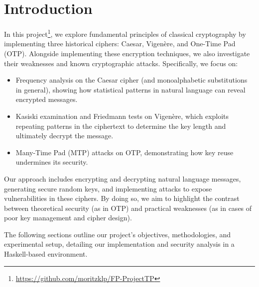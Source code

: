 \section{Introduction}
In this project\footnote{\url{https://github.com/moritzklp/FP-ProjectTP}}, 
we explore fundamental principles of classical cryptography by implementing three historical ciphers: Caesar, Vigenère, and One-Time Pad (OTP). 
Alongside implementing these encryption techniques, we also investigate their weaknesses and known cryptographic attacks. 
Specifically, we focus on:

\begin{itemize}
    \item Frequency analysis on the Caesar cipher (and monoalphabetic substitutions in general), 
    showing how statistical patterns in natural language can reveal encrypted messages.
    \item Kasiski examination and Friedmann tests on Vigenère, 
    which exploits repeating patterns in the ciphertext to determine the key length and ultimately decrypt the message.
    \item Many-Time Pad (MTP) attacks on OTP, demonstrating how key reuse undermines its security.
\end{itemize}

Our approach includes encrypting and decrypting natural language messages, generating secure random keys, 
and implementing attacks to expose vulnerabilities in these ciphers. 
By doing so, we aim to highlight the contrast between theoretical security (as in OTP) 
and practical weaknesses (as in cases of poor key management and cipher design).

The following sections outline our project’s objectives, methodologies, and experimental setup, 
detailing our implementation and security analysis in a Haskell-based environment.
